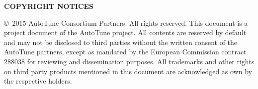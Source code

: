 \medskip

\textbf{COPYRIGHT NOTICES}

\medskip

\copyright~2015 AutoTune Consortium Partners. All rights reserved. This document is a project document of the AutoTune project. All contents are reserved by default and may not be disclosed to third parties without the written consent of the AutoTune  partners, except as mandated by the European Commission contract 288038 for reviewing and dissemination purposes. All trademarks and other rights on third party products mentioned in this document are acknowledged as own by the respective holders.
